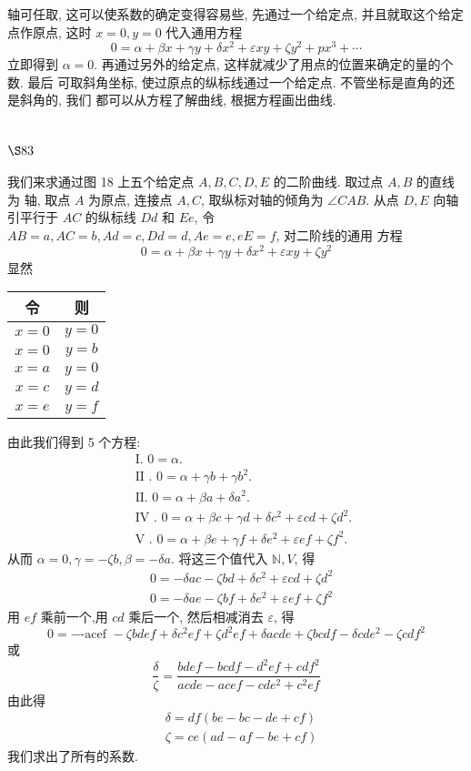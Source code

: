 轴可任取, 这可以使系数的确定变得容易些, 先通过一个给定点, 并且就取这个给定 点作原点, 这时 $x=0, y=0$ 代入通用方程
\[
0=\alpha+\beta x+\gamma y+\delta x^{2}+\varepsilon x y+\zeta y^{2}+p x^{3}+\cdots
\]
立即得到 $\alpha=0$. 再通过另外的给定点, 这样就减少了用点的位置来确定的量的个数. 最后 可取斜角坐标, 使过原点的纵标线通过一个给定点. 不管坐标是直角的还是斜角的, 我们 都可以从方程了解曲线, 根据方程画出曲线.

\section{$\S 83$}

我们来求通过图 18 上五个给定点 $A, B, C, D, E$ 的二阶曲线. 取过点 $A, B$ 的直线为 轴, 取点 $A$ 为原点, 连接点 $A, C$, 取纵标对轴的倾角为 $\angle C A B$. 从点 $D, E$ 向轴引平行于 $A C$ 的纵标线 $D d$ 和 $E e$, 令 $A B=a, A C=b, A d=c, D d=d, A e=e, e E=f$, 对二阶线的通用 方程
\[
0=\alpha+\beta x+\gamma y+\delta x^{2}+\varepsilon x y+\zeta y^{2}
\]
显然

\begin{tabular}{c|c}
\hline 令 & 则 \\
\hline$x=0$ & $y=0$ \\
\hline$x=0$ & $y=b$ \\
\hline$x=a$ & $y=0$ \\
\hline$x=c$ & $y=d$ \\
\hline$x=e$ & $y=f$ \\
\hline
\end{tabular}

由此我们得到 5 个方程:
\[
\begin{aligned}
& \text { I. } 0=\alpha . \\
& \text { II . } 0=\alpha+\gamma b+\gamma b^{2} . \\
& \text { II. } 0=\alpha+\beta a+\delta a^{2} . \\
& \text { IV . } 0=\alpha+\beta c+\gamma d+\delta c^{2}+\varepsilon c d+\zeta d^{2} . \\
& \text { V . } 0=\alpha+\beta e+\gamma f+\delta e^{2}+\varepsilon e f+\zeta f^{2} .
\end{aligned}
\]
从而 $\alpha=0, \gamma=-\zeta b, \beta=-\delta a$. 将这三个值代入 $\mathbb{N}, V$, 得
\[
\begin{aligned}
& 0=-\delta a c-\zeta b d+\delta c^{2}+\varepsilon c d+\zeta d^{2} \\
& 0=-\delta a e-\zeta b f+\delta e^{2}+\varepsilon e f+\zeta f^{2}
\end{aligned}
\]
用 $e f$ 乘前一个,用 $c d$ 乘后一个, 然后相减消去 $\varepsilon$, 得
\[
0=-\text {-acef }-\zeta b d e f+\delta c^{2} e f+\zeta d^{2} e f+\delta a c d e+\zeta b c d f-\delta c d e^{2}-\zeta c d f^{2}
\]
或
\[
\frac{\delta}{\zeta}=\frac{b d e f-b c d f-d^{2} e f+c d f^{2}}{a c d e-a c e f-c d e^{2}+c^{2} e f}
\]
由此得
\[
\begin{aligned}
& \delta=d f(b e-b c-d e+c f) \\
& \zeta=c e(a d-a f-b e+c f)
\end{aligned}
\]
我们求出了所有的系数.


